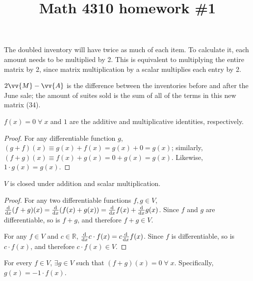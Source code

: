 

\title{Math 4310 homework \#1}
\author{\name}
\maketitle


The doubled inventory will have twice as much of each item. To calculate it, each amount needs to be multiplied by 2. This is equivalent to multiplying the entire matrix by 2, since matrix multiplication by a scalar multiplies each entry by 2.

$2\vv{M} - \vv{A}$ is the difference between the inventories before and after the June sale; the amount of suites sold is the sum of all of the terms in this new matrix (34).


\begin{lemma}
    $f(x) = 0 \;\forall\; x$ and $1$ are the additive and multiplicative identities, respectively.
\end{lemma}

\begin{proof}
    For any differentiable function $g$, $(g + f)(x) \equiv g(x) + f(x) = g(x) + 0 = g(x)$; similarly, $(f + g)(x) \equiv f(x) + g(x) = 0 + g(x) = g(x)$. Likewise, $1 \cdot g(x) = g(x)$.
\end{proof}

\begin{lemma}
    $V$ is closed under addition and scalar multiplication.
\end{lemma}

\begin{proof}
    For any two differentiable functions $f, g \in V$, $\frac{\diff}{\diff x} (f + g)(x) = \frac{\diff}{\diff x} (f(x) + g(x)) = \frac{\diff}{\diff x} f(x) + \frac{\diff}{\diff x} g(x)$. Since $f$ and $g$ are differentiable, so is $f + g$, and therefore $f + g \in V$.

    For any $f \in V$ and $c \in \mathbb{R}$, $\frac{\mathop{}\!\mathrm{d}}{\mathop{}\!\mathrm{d} x} c \cdot f(x) = c \frac{\mathop{}\!\mathrm{d}}{\mathop{}\!\mathrm{d} x} f(x)$. Since $f$ is differentiable, so is $c \cdot f(x)$, and therefore $c \cdot f(x) \in V$.
\end{proof}

\begin{lemma}
    For every $f \in V$, $\exists g \in V$ such that $(f + g)(x) = 0 \;\forall\; x$. Specifically, $g(x) = -1 \cdot f(x)$.
\end{lemma}


